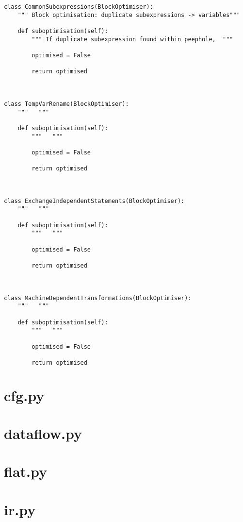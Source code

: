 \begin{lstlisting}
class CommonSubexpressions(BlockOptimiser):
    """ Block optimisation: duplicate subexpressions -> variables"""

    def suboptimisation(self):
        """ If duplicate subexpression found within peephole,  """

        optimised = False

        return optimised



class TempVarRename(BlockOptimiser):
    """   """

    def suboptimisation(self):
        """   """

        optimised = False

        return optimised



class ExchangeIndependentStatements(BlockOptimiser):
    """   """

    def suboptimisation(self):
        """   """

        optimised = False

        return optimised



class MachineDependentTransformations(BlockOptimiser):
    """   """

    def suboptimisation(self):
        """   """

        optimised = False

        return optimised
\end{lstlisting}
\newpage
\section{cfg.py}


\newpage
\section{dataflow.py}


\newpage
\section{flat.py}


\newpage
\section{ir.py}


\newpage
